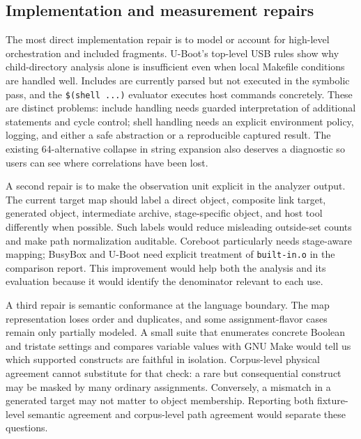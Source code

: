 \documentclass[acmsmall,screen,review]{acmart}
\begin{document}
\subsection{Implementation and measurement repairs}
The most direct implementation repair is to model or account for high-level orchestration and included fragments. U-Boot's top-level USB rules show why child-directory analysis alone is insufficient even when local Makefile conditions are handled well. Includes are currently parsed but not executed in the symbolic pass, and the \texttt{\$(shell ...)} evaluator executes host commands concretely. These are distinct problems: include handling needs guarded interpretation of additional statements and cycle control; shell handling needs an explicit environment policy, logging, and either a safe abstraction or a reproducible captured result. The existing 64-alternative collapse in string expansion also deserves a diagnostic so users can see where correlations have been lost.

A second repair is to make the observation unit explicit in the analyzer output. The current target map should label a direct object, composite link target, generated object, intermediate archive, stage-specific object, and host tool differently when possible. Such labels would reduce misleading outside-set counts and make path normalization auditable. Coreboot particularly needs stage-aware mapping; BusyBox and U-Boot need explicit treatment of \texttt{built-in.o} in the comparison report. This improvement would help both the analysis and its evaluation because it would identify the denominator relevant to each use.

A third repair is semantic conformance at the language boundary. The map representation loses order and duplicates, and some assignment-flavor cases remain only partially modeled. A small suite that enumerates concrete Boolean and tristate settings and compares variable values with GNU Make would tell us which supported constructs are faithful in isolation. Corpus-level physical agreement cannot substitute for that check: a rare but consequential construct may be masked by many ordinary assignments. Conversely, a mismatch in a generated target may not matter to object membership. Reporting both fixture-level semantic agreement and corpus-level path agreement would separate these questions.
\end{document}
